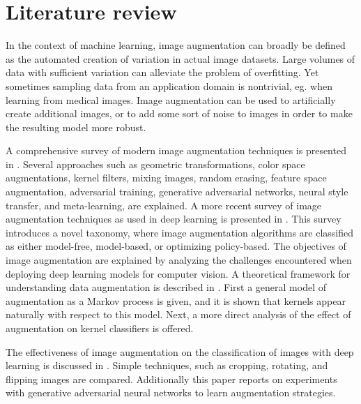 \documentclass[]{article}
\begin{document}
\section{Literature review}

	In the context of machine learning, image augmentation can broadly be defined as the automated creation of variation in actual image datasets. Large volumes of data with sufficient variation can alleviate the problem of overfitting. Yet sometimes sampling data from an application domain is nontrivial, eg. when learning from medical images.  Image augmentation can be used to artificially create additional images, or to add some sort of noise to images in order to make the resulting model more robust.
	
	A comprehensive survey of modern image augmentation techniques is presented in \cite{shortenSurveyImageData2019}. Several approaches such as geometric transformations, color space augmentations, kernel filters, mixing images, random erasing, feature space augmentation, adversarial training, generative adversarial networks, neural style transfer, and meta-learning, are explained.  A more recent survey of image augmentation techniques as used in deep learning is presented in \cite{xuComprehensiveSurveyImage2023} . This survey introduces a novel taxonomy, where image augmentation algorithms are classified as either model-free, model-based, or optimizing policy-based. The objectives of image augmentation are explained by analyzing the challenges encountered when deploying deep learning models for computer vision. A theoretical framework for understanding data augmentation is described in \cite{daoKernelTheoryModern2019}. First a general model of augmentation as a Markov process is given, and it is shown that kernels appear naturally with respect to this model. Next, a more direct analysis of the effect of augmentation on kernel classifiers is offered.
	
	The effectiveness of image augmentation on the classification of images with deep learning is discussed in \cite{perezEffectivenessDataAugmentation2017}. Simple techniques, such as cropping, rotating, and flipping images are compared. Additionally this paper reports on experiments with generative adversarial neural networks to learn augmentation strategies.
	
\end{document}
